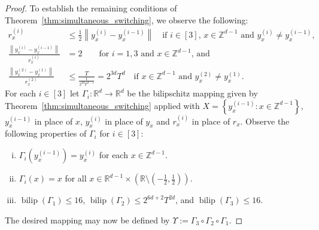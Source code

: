 \documentclass[a4paper, bibliography=totoc]{scrartcl}
\numberwithin{claimcounter}{define}
\newcommand{\R}{\mathbb{R}}
\newcommand{\Z}{\mathbb{Z}}
\newcommand{\bilip}{\operatorname{bilip}}
\newcommand{\enorm}[1]{\left\|#1\right\|}
\newcommand{\set}[1]{\left\{#1\right\}}
\newcommand{\br}[1]{\left(#1\right)}
\newcommand{\upp}[1]{^{(#1)}}
\begin{document}
\begin{proof}
	To establish the remaining conditions of Theorem~\ref{thm:simultaneous_switching}, we observe the following:
	\begin{align*}
	r_{x}\upp{i}&\leq \frac{1}{2}\enorm{y_{x}\upp{i}-y_{x}\upp{i-1}}\quad\text{if $i\in [3]$, $x\in\Z^{d-1}$ and $y_{x}\upp{i}\neq y_{x}\upp{i-1}$,}\\
	\frac{\enorm{y_{x}\upp{i}-y_{x}\upp{i-1}}}{r_{x}\upp{i}}&=2 \qquad \text{for $i=1,3$ and $x\in \Z^{d-1}$, and}\\
	\frac{\enorm{y_{x}\upp{2}-y_{x}\upp{1}}}{r_{x}\upp{2}}&\leq\frac{T}{\frac{1}{2^{3d}T^{d-1}}}=2^{3d}T^{d}\quad\text{if $x\in\Z^{d-1}$ and $y_{x}\upp{2}\neq y_{x}\upp{1}$.}
	\end{align*}
	For each $i\in [3]$ let $\Gamma_{i}\colon\R^{d}\to\R^{d}$ be the bilipschitz mapping given by Theorem~\ref{thm:simultaneous_switching} applied with $X=\set{y_{x}\upp{i-1}\colon x\in\Z^{d-1}}$, $y_{x}\upp{i-1}$ in place of $x$, $y_{x}\upp{i}$ in place of $y_{x}$ and $r_{x}\upp{i}$ in place of $r_{x}$. Observe the following properties of $\Gamma_{i}$ for $i\in[3]$:
	\begin{enumerate}[(i)]
		\item\label{Gammai1} $\Gamma_{i}\br{y_{x}\upp{i-1}}=y_{x}\upp{i}$ for each $x\in \Z^{d-1}$.
		\item\label{Gammai3} $\Gamma_{i}(x)=x$ for all $x\in \R^{d-1}\times\br{\R\setminus\br{-\frac{1}{2},\frac{1}{2}}}$.
		\item\label{Gammai4} $\bilip(\Gamma_{1})\leq 16$, $\bilip(\Gamma_{2})\leq 2^{6d+2}T^{2d}$, and $\bilip(\Gamma_{3})\leq 16$.
	\end{enumerate}
	The desired mapping may now be defined by $\Upsilon:=\Gamma_{3}\circ\Gamma_{2}\circ\Gamma_{1}$.
\end{proof}
\end{document}
